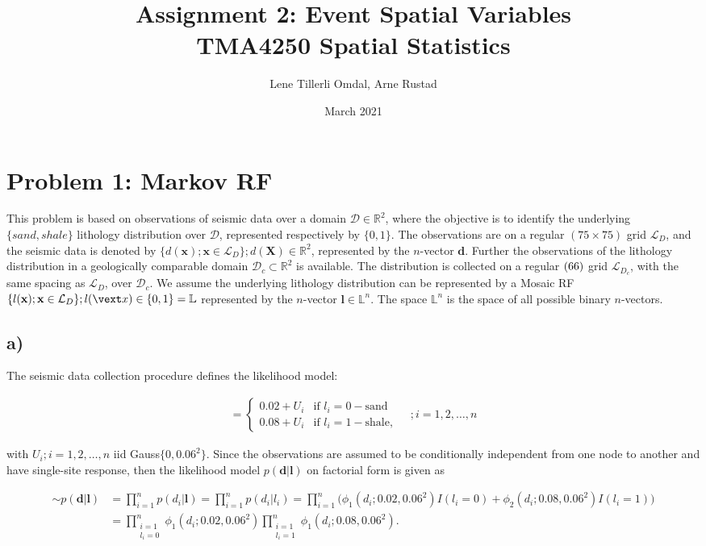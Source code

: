 \documentclass{article}
\title{Assignment 2: Event Spatial Variables \\
\vspace{0.5cm}
\large{TMA4250 Spatial Statistics}
}
\author{Lene Tillerli Omdal, Arne Rustad}
\date{March 2021}
\newcommand{\vect}[1]{\ensuremath{\boldsymbol{\mathbf{#1} }}}
\newcommand{\domain}[1]{\ensuremath{\mathcal{#1}}}
\begin{document}
\maketitle

\section*{Problem 1: Markov RF}

This problem is based on observations of seismic data over a domain $\domain D \in \mathbb{R}^2$, where the objective is to identify the underlying $\{sand, shale\}$ lithology distribution over $\domain D$, represented respectively by $\{0,1\}$.
The observations are on a regular $(75\times 75)$ grid $\domain L_D$, and the seismic data is denoted by $\{d(\vect x);\vect x \in \domain L_D\};d(\vect X) \in \mathbb{R}^2$, represented by the $n$-vector $\vect d$. Further the observations of the lithology distribution in a geologically comparable domain $ \domain D_c \subset \mathbb{R}^2$ is available. The distribution is collected on a regular $(66\time66)$ grid $\domain L_D_c$, with the same spacing as $\domain L_D$, over $\domain D_c$. We assume the underlying lithology distribution can be represented by a Mosaic RF $\{l(\vect x); \vect x \in \domain L_D\}; l(\vext x) \in \{0,1\} = \mathbb{L}$ represented by the $n$-vector $\vect l \in \mathbb{L}^n$. The space $\mathbb{L}^n$ is the space of all possible binary $n$-vectors. 

\subsection*{a)}

The seismic data collection procedure defines the likelihood model:

\begin{align*}
    [d_i|\vect l] = \begin{cases}0.02 +U_i & \text{if } l_i = 0 - \text{sand}\\
    0.08 +U_i & \text{if } l_i = 1 - \text{shale},
    \end{cases} \quad ; i = 1, 2, \dots , n
\end{align*}

with  $U_i; i = 1,2, \dots , n$ iid Gauss$\{0,0.06^2\}$. Since the observations are assumed to be conditionally independent from one node to another and have single-site response, then the likelihood model $p(\vect d| \vect l)$ on factorial form is given as

\begin{align*}
    [\vect d| \vect l] \sim p(\vect d| \vect l) &= \prod_{i=1}^n p(d_i|\vect l) = \prod_{i=1}^n p (d_i|l_i) = \prod_{i=1}^n \bigg( \phi_1(d_i;0.02, 0.06^2)I(l_i=0)+\phi_2(d_i;0.08,0.06^2)I(l_i=1)\bigg)\\
    &= \prod_{\substack{i=1 \\ l_i= 0}}^n \phi_1(d_i;0.02, 0.06^2)\prod_{\substack{i=1 \\ l_i = 1}}^n\phi_1(d_i;0.08,0.06^2).
\end{align*}
 
\end{document}
